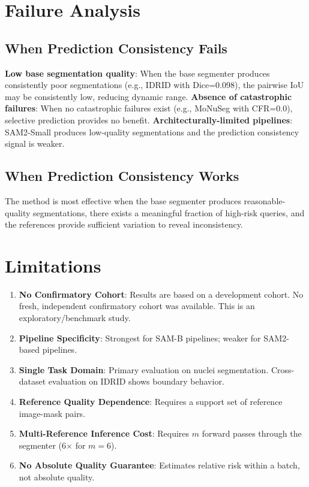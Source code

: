 \documentclass[11pt]{article}
\begin{document}
\section{Failure Analysis}

\subsection{When Prediction Consistency Fails}
\textbf{Low base segmentation quality}: When the base segmenter produces consistently poor 
segmentations (e.g., IDRID with Dice=0.098), the pairwise IoU may be consistently low, 
reducing dynamic range. \textbf{Absence of catastrophic failures}: When no catastrophic 
failures exist (e.g., MoNuSeg with CFR=0.0), selective prediction provides no benefit. 
\textbf{Architecturally-limited pipelines}: SAM2-Small produces low-quality segmentations 
and the prediction consistency signal is weaker.

\subsection{When Prediction Consistency Works}
The method is most effective when the base segmenter produces reasonable-quality segmentations, 
there exists a meaningful fraction of high-risk queries, and the references provide sufficient 
variation to reveal inconsistency.

\section{Limitations}

\begin{enumerate}[leftmargin=*]
\item \textbf{No Confirmatory Cohort}: Results are based on a development cohort. No fresh, 
independent confirmatory cohort was available. This is an exploratory/benchmark study.
\item \textbf{Pipeline Specificity}: Strongest for SAM-B pipelines; weaker for SAM2-based pipelines.
\item \textbf{Single Task Domain}: Primary evaluation on nuclei segmentation. Cross-dataset 
evaluation on IDRID shows boundary behavior.
\item \textbf{Reference Quality Dependence}: Requires a support set of reference image-mask pairs.
\item \textbf{Multi-Reference Inference Cost}: Requires $m$ forward passes through the segmenter 
(6$\times$ for $m=6$).
\item \textbf{No Absolute Quality Guarantee}: Estimates relative risk within a batch, not absolute quality.
\end{enumerate}
\end{document}
